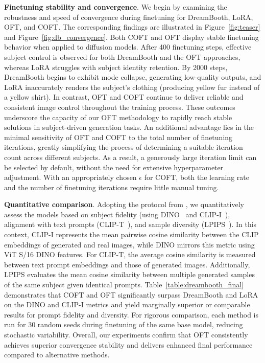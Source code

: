 \textbf{Finetuning stability and convergence}. We begin by examining the robustness and speed of convergence during finetuning for DreamBooth, LoRA, OFT, and COFT. The corresponding findings are illustrated in Figure~\ref{fig:teaser} and Figure~\ref{fig:db_convergence}. Both COFT and OFT display stable finetuning behavior when applied to diffusion models. After 400 finetuning steps, effective subject control is observed for both DreamBooth and the OFT approaches, whereas LoRA struggles with subject identity retention. By 2000 steps, DreamBooth begins to exhibit mode collapse, generating low-quality outputs, and LoRA inaccurately renders the subject’s clothing (producing yellow fur instead of a yellow shirt). In contrast, OFT and COFT continue to deliver reliable and consistent image control throughout the training process. These outcomes underscore the capacity of our OFT methodology to rapidly reach stable solutions in subject-driven generation tasks. An additional advantage lies in the minimal sensitivity of OFT and COFT to the total number of finetuning iterations, greatly simplifying the process of determining a suitable iteration count across different subjects. As a result, a generously large iteration limit can be selected by default, without the need for extensive hyperparameter adjustment. With an appropriately chosen $\epsilon$ for COFT, both the learning rate and the number of finetuning iterations require little manual tuning.

\textbf{Quantitative comparison}. Adopting the protocol from \cite{ruiz2023dreambooth}, we quantitatively assess the models based on subject fidelity (using DINO~\cite{caron2021emerging} and CLIP-I~\cite{radford2021learning}), alignment with text prompts (CLIP-T~\cite{radford2021learning}), and sample diversity (LPIPS~\cite{zhang2018unreasonable}). In this context, CLIP-I represents the mean pairwise cosine similarity between the CLIP embeddings of generated and real images, while DINO mirrors this metric using ViT S/16 DINO features. For CLIP-T, the average cosine similarity is measured between text prompt embeddings and those of generated images. Additionally, LPIPS evaluates the mean cosine similarity between multiple generated samples of the same subject given identical prompts. Table~\ref{table:dreambooth_final} demonstrates that COFT and OFT significantly surpass DreamBooth and LoRA on the DINO and CLIP-I metrics and yield marginally superior or comparable results for prompt fidelity and diversity. For rigorous comparison, each method is run for 30 random seeds during finetuning of the same base model, reducing stochastic variability. Overall, our experiments confirm that OFT consistently achieves superior convergence stability and delivers enhanced final performance compared to alternative methods.

